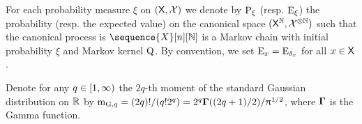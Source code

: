 For each probability measure $\xi$ on $(\Xset,\Xsigma)$ we denote by
$\PP_{\xi}$ (resp. $\PE_{\xi}$) the probability (resp. the expected value) on the canonical space $(\Xset^\nset,\Xsigma^{\otimes \nset})$ such that the canonical process is
$\sequence{X}[n][\nset]$ is a Markov chain with initial probability $\xi$ and Markov kernel $\MK$. By convention, we set
$\PE_{x} = \PE_{\delta_x}$ for all $x \in \Xset$.

Denote for any $q \in \coint{1,\infty}$ the $2q$-th moment of the
standard Gaussian distribution on $\rset$ by  $\momentGq[q] = (2q)! / (q! 2^{q}) = 2^{q}\Gammabf((2q+1)/2)/\uppi^{1/2}$, where $\Gammabf$ is the Gamma function.